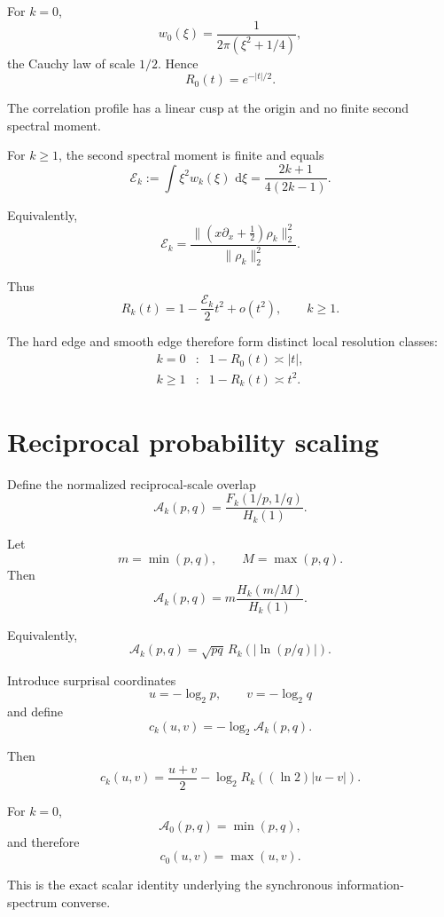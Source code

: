 \documentclass[11pt,a4paper]{article}
\newcommand{\1}{\mathbf 1}
\newcommand{\dd}{\,\mathrm d}
\begin{document}
For \(k=0\),
\[
w_0(\xi)
=
\frac1{2\pi(\xi^2+1/4)},
\tag{32.1}
\]
the Cauchy law of scale \(1/2\).
Hence
\[
\boxed{
R_0(t)=e^{-|t|/2}.
}
\tag{32.2}
\]

The correlation profile has a linear cusp at the origin and no finite
second spectral moment.

For \(k\ge1\), the second spectral moment is finite and equals
\[
\boxed{
\mathcal E_k
:=
\int\xi^2w_k(\xi)\,\dd\xi
=
\frac{2k+1}{4(2k-1)}.
}
\tag{32.3}
\]

Equivalently,
\[
\mathcal E_k
=
\frac{
\|\left(x\partial_x+\frac12\right)\rho_k\|_2^2
}{
\|\rho_k\|_2^2
}.
\tag{32.4}
\]

Thus
\[
\boxed{
R_k(t)
=
1-\frac{\mathcal E_k}{2}t^2+o(t^2),
\qquad
k\ge1.
}
\tag{32.5}
\]

The hard edge and smooth edge therefore form distinct local resolution
classes:
\[
\boxed{
\begin{array}{ccl}
k=0
&:&
1-R_0(t)\asymp|t|,
\\[1mm]
k\ge1
&:&
1-R_k(t)\asymp t^2.
\end{array}
}
\tag{32.6}
\]


\section{Reciprocal probability scaling}

Define the normalized reciprocal-scale overlap
\[
\boxed{
\mathcal A_k(p,q)
=
\frac{F_k(1/p,1/q)}{H_k(1)}.
}
\tag{33.1}
\]

Let
\[
m=\min(p,q),
\qquad
M=\max(p,q).
\]
Then
\[
\boxed{
\mathcal A_k(p,q)
=
m
\frac{H_k(m/M)}{H_k(1)}.
}
\tag{33.2}
\]

Equivalently,
\[
\boxed{
\mathcal A_k(p,q)
=
\sqrt{pq}\,
R_k(|\ln(p/q)|).
}
\tag{33.3}
\]

Introduce surprisal coordinates
\[
u=-\log_2p,
\qquad
v=-\log_2q
\]
and define
\[
c_k(u,v)
=
-\log_2\mathcal A_k(p,q).
\tag{33.4}
\]

Then
\[
\boxed{
c_k(u,v)
=
\frac{u+v}{2}
-
\log_2
R_k((\ln2)|u-v|).
}
\tag{33.5}
\]

For \(k=0\),
\[
\boxed{
\mathcal A_0(p,q)=\min(p,q),
}
\tag{33.6}
\]
and therefore
\[
\boxed{
c_0(u,v)=\max(u,v).
}
\tag{33.7}
\]

This is the exact scalar identity underlying the synchronous
information-spectrum converse.
\end{document}
